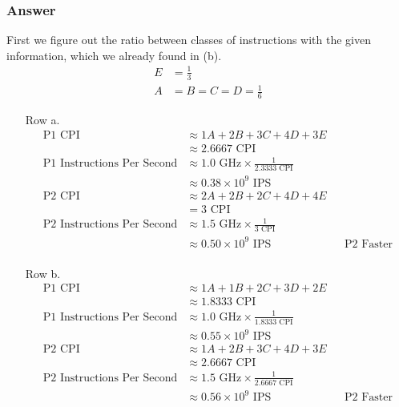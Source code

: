 \documentclass[12pt]{article}
\begin{document}
\begin{itemize}
\subsubsection*{Answer}
First we figure out the ratio between classes of instructions with the given information, which we already found in (b).
\begin{align*}
E &= \frac{1}{3} \\
A &= B = C = D = \frac{1}{6}
\end{align*}
\begin{itemize}
\item[Row a.]
\begin{align*}
\text{P1 CPI} &\approx 1A + 2B + 3C + 4D + 3E \\ 
&\approx 2.6667\text{ CPI} \\
\text{P1 Instructions Per Second} &\approx 1.0\text{ GHz} \times \frac{1}{2.3333\text{ CPI}} \\
&\approx 0.38 \times 10^9\text{ IPS} \\
\text{P2 CPI} &\approx 2A + 2B + 2C + 4D + 4E \\ 
&= 3\text{ CPI} \\
\text{P2 Instructions Per Second} &\approx 1.5\text{ GHz} \times \frac{1}{3\text{ CPI}} \\
&\approx 0.50 \times 10^9\text{ IPS} && \boxed{\text{P2 Faster}}\\
\end{align*}
\item[Row b.]
\begin{align*}
\text{P1 CPI} &\approx 1A + 1B + 2C + 3D + 2E \\ 
&\approx 1.8333\text{ CPI} \\
\text{P1 Instructions Per Second} &\approx 1.0\text{ GHz} \times \frac{1}{1.8333\text{ CPI}} \\
&\approx 0.55 \times 10^9\text{ IPS} \\
\text{P2 CPI} &\approx 1A + 2B + 3C + 4D + 3E \\ 
&\approx 2.6667\text{ CPI} \\
\text{P2 Instructions Per Second} &\approx 1.5\text{ GHz} \times \frac{1}{2.6667\text{ CPI}} \\
&\approx 0.56 \times 10^9\text{ IPS} && \boxed{\text{P2 Faster}}\\
\end{align*}
\end{itemize}
\end{itemize}
\end{document}
